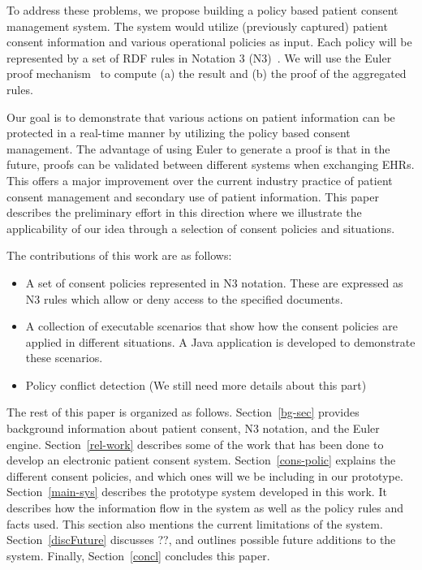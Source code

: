 \documentclass[conference]{IEEEtran}
\begin{document}
To address these problems, we propose building a policy based patient consent management system. The system would utilize (previously captured) patient consent
information and various operational policies as input. Each policy will be represented by a set of RDF rules in Notation 3 (N3)~\cite{N3not}.  We will use the
Euler proof mechanism~\cite{eurlorprf} to compute (a) the result and (b) the proof of the aggregated rules.  


Our goal is to demonstrate that various actions on patient information can be protected in a real-time manner by utilizing the policy based consent management.
The advantage of using Euler to generate a proof is that in the future, proofs can be validated between different systems when exchanging EHRs. This offers a
major improvement over the current industry practice of patient consent management and secondary use of patient information. This paper describes the
preliminary effort in this direction where we illustrate the applicability of our idea through a selection of consent policies and situations.


The contributions of this work are as follows: 

\begin{itemize}
    \item A set of consent policies represented in N3 notation. These are expressed as N3 rules which allow or deny access to the specified documents.

\item A collection of executable scenarios that show how the consent policies are applied in different situations. A Java application is developed to demonstrate these scenarios.

\item Policy conflict detection (We still need more details about this part)
\end{itemize}

The rest of this paper is organized as follows. Section~\ref{bg-sec} provides background information about patient consent, N3 notation, and the Euler engine. Section~\ref{rel-work} describes some of the work that has been done to develop an electronic patient consent system. Section~\ref{cons-polic} explains the different consent policies, and which ones will we be including in our prototype. Section~\ref{main-sys} describes the prototype system developed in this work. It describes how the information flow in the system as well as the policy rules and facts used. This section also mentions the current limitations of the system. Section~\ref{discFuture} discusses ??, and outlines possible future additions to the system. Finally, Section~\ref{concl} concludes this paper.
\end{document}

